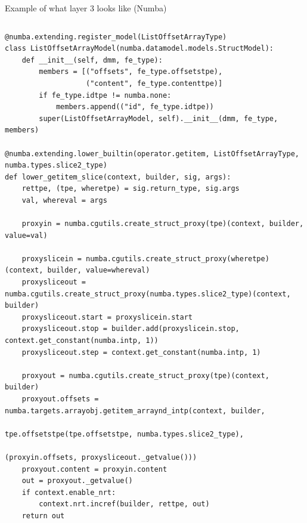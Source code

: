 \documentclass[aspectratio=169]{beamer}
\begin{document}
\begin{frame}[fragile]{Example of what layer 3 looks like (Numba)}
\tiny
\vspace{0.05 cm}
\begin{columns}
\begin{verbatim}
@numba.extending.register_model(ListOffsetArrayType)
class ListOffsetArrayModel(numba.datamodel.models.StructModel):
    def __init__(self, dmm, fe_type):
        members = [("offsets", fe_type.offsetstpe),
                   ("content", fe_type.contenttpe)]
        if fe_type.idtpe != numba.none:
            members.append(("id", fe_type.idtpe))
        super(ListOffsetArrayModel, self).__init__(dmm, fe_type, members)

@numba.extending.lower_builtin(operator.getitem, ListOffsetArrayType, numba.types.slice2_type)
def lower_getitem_slice(context, builder, sig, args):
    rettpe, (tpe, wheretpe) = sig.return_type, sig.args
    val, whereval = args

    proxyin = numba.cgutils.create_struct_proxy(tpe)(context, builder, value=val)

    proxyslicein = numba.cgutils.create_struct_proxy(wheretpe)(context, builder, value=whereval)
    proxysliceout = numba.cgutils.create_struct_proxy(numba.types.slice2_type)(context, builder)
    proxysliceout.start = proxyslicein.start
    proxysliceout.stop = builder.add(proxyslicein.stop, context.get_constant(numba.intp, 1))
    proxysliceout.step = context.get_constant(numba.intp, 1)

    proxyout = numba.cgutils.create_struct_proxy(tpe)(context, builder)
    proxyout.offsets = numba.targets.arrayobj.getitem_arraynd_intp(context, builder,
                                                                   tpe.offsetstpe(tpe.offsetstpe, numba.types.slice2_type),
                                                                   (proxyin.offsets, proxysliceout._getvalue()))
    proxyout.content = proxyin.content
    out = proxyout._getvalue()
    if context.enable_nrt:
        context.nrt.incref(builder, rettpe, out)
    return out
\end{verbatim}
\end{columns}
\end{frame}
\end{document}
